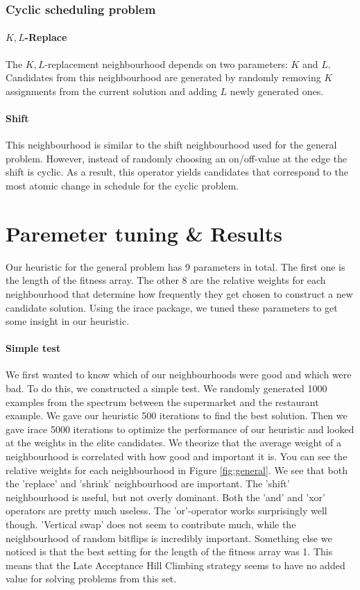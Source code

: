 \documentclass[]{article}
\begin{document}
\subsubsection{Cyclic scheduling problem}
\paragraph{$K,L$-Replace}
The $K,L$-replacement neighbourhood depends on two parameters: $K$ and $L$. Candidates from this neighbourhood are generated by randomly removing $K$ assignments from the current solution and adding $L$ newly generated ones.

\paragraph{Shift}
This neighbourhood is similar to the shift neighbourhood used for the general problem. However, instead of randomly choosing an on/off-value at the edge the shift is cyclic.
As a result, this operator yields candidates that correspond to the most atomic change in schedule for the cyclic problem.

\section{Paremeter tuning \& Results}
Our heuristic for the general problem has 9 parameters in total. The first one is the length of the fitness array. The other 8 are the relative weights for each neighbourhood that determine how frequently they get chosen to construct a new candidate solution. Using the irace package, we tuned these parameters to get some insight in our heuristic.

\paragraph{Simple test}
We first wanted to know which of our neighbourhoods were good and which were bad. To do this, we constructed a simple test. We randomly generated 1000 examples from the spectrum between the supermarket and the restaurant example. We gave our heuristic 500 iterations to find the best solution. Then we gave irace 5000 iterations to optimize the performance of our heuristic and looked at the weights in the elite candidates. We theorize that the average weight of a neighbourhood is correlated with how good and important it is. You can see the relative weights for each neighbourhood in Figure \ref{fig:general}. We see that both the 'replace' and 'shrink' neighbourhood are important. The 'shift' neighbourhood is useful, but not overly dominant. Both the 'and' and 'xor' operators are pretty much useless. The 'or'-operator works surprisingly well though. 'Vertical swap' does not seem to contribute much, while the neighbourhood of random bitflips is incredibly important. Something else we noticed is that the best setting for the length of the fitness array was 1. This means that the Late Acceptance Hill Climbing strategy seems to have no added value for solving problems from this set.
\end{document}
